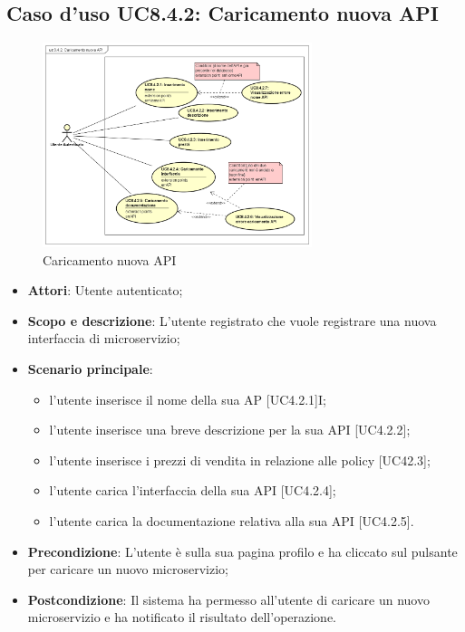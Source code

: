 \documentclass[12pt,a4paper,titlepage]{article}
\begin{document}
	\subsection{Caso d'uso UC8.4.2: Caricamento nuova API}
	\label{UC8.4.2}
	\begin{figure}[H]
		\centering
		\includegraphics[width=0.7\textwidth]{UseCase/CaricamentoNuovaAPI}
		\caption{Caricamento nuova API}
	\end{figure}
	\begin{itemize}
		\item \textbf{Attori}: Utente autenticato;
		\item \textbf{Scopo e descrizione}: L'utente registrato che vuole registrare una nuova interfaccia di microservizio;
		\item \textbf{Scenario principale}:
			\begin{itemize}
				\item l'utente inserisce il nome della sua AP [UC4.2.1]I;
				\item l'utente inserisce una breve descrizione per la sua API [UC4.2.2];
				\item l'utente inserisce i prezzi di vendita in relazione alle policy [UC42.3];
				\item l'utente carica l'interfaccia della sua API [UC4.2.4];
				\item l'utente carica la documentazione relativa alla sua API [UC4.2.5].
			\end{itemize}
		\item \textbf{Precondizione}: L'utente è sulla sua pagina profilo e ha cliccato sul pulsante per caricare un nuovo microservizio;
		\item \textbf{Postcondizione}: Il sistema ha permesso all'utente di caricare un nuovo microservizio e ha notificato il risultato dell'operazione.
	\end{itemize}
\end{document}
